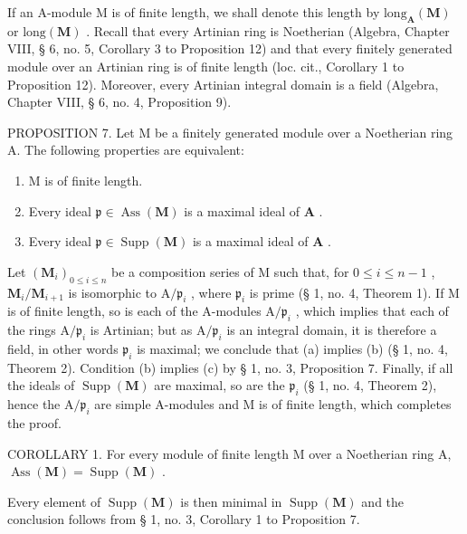 If an A-module M is of finite length, we shall denote this length by \(\text{long}_{\mathbf{A}}(\mathbf{M})\) or \(\text{long}(\mathbf{M})\) . Recall that every Artinian ring is Noetherian (Algebra, Chapter VIII, § 6, no. 5, Corollary 3 to Proposition 12) and that every finitely generated module over an Artinian ring is of finite length (loc. cit., Corollary 1 to Proposition 12). Moreover, every Artinian integral domain is a field (Algebra, Chapter VIII, § 6, no. 4, Proposition 9).

PROPOSITION 7. Let M be a finitely generated module over a Noetherian ring A. The following properties are equivalent:

\begin{enumerate}
\def\labelenumi{(\alph{enumi})}
\item
  M is of finite length.
\item
  Every ideal \(\mathfrak{p} \in \operatorname{Ass}(\mathbf{M})\) is a maximal ideal of \(\mathbf{A}\) .
\item
  Every ideal \(\mathfrak{p} \in \operatorname{Supp}(\mathbf{M})\) is a maximal ideal of \(\mathbf{A}\) .
\end{enumerate}

Let \((\mathbf{M}_i)_{0\leqslant i\leqslant n}\) be a composition series of M such that, for \(0\leqslant i\leqslant n - 1\) , \(\mathbf{M}_i / \mathbf{M}_{i + 1}\) is isomorphic to \(\mathrm{A} / \mathfrak{p}_i\) , where \(\mathfrak{p}_i\) is prime (§ 1, no. 4, Theorem 1). If M is of finite length, so is each of the A-modules \(\mathrm{A} / \mathfrak{p}_i\) , which implies that each of the rings \(\mathrm{A} / \mathfrak{p}_i\) is Artinian; but as \(\mathrm{A} / \mathfrak{p}_i\) is an integral domain, it is therefore a field, in other words \(\mathfrak{p}_i\) is maximal; we conclude that (a) implies (b) (§ 1, no. 4, Theorem 2). Condition (b) implies (c) by § 1, no. 3, Proposition 7. Finally, if all the ideals of \(\operatorname {Supp}(\mathbf{M})\) are maximal, so are the \(\mathfrak{p}_i\) (§ 1, no. 4, Theorem 2), hence the \(\mathrm{A} / \mathfrak{p}_i\) are simple A-modules and M is of finite length, which completes the proof.

COROLLARY 1. For every module of finite length M over a Noetherian ring A, \(\operatorname{Ass}(\mathbf{M}) = \operatorname{Supp}(\mathbf{M})\) .

Every element of \(\operatorname{Supp}(\mathbf{M})\) is then minimal in \(\operatorname{Supp}(\mathbf{M})\) and the conclusion follows from § 1, no. 3, Corollary 1 to Proposition 7.

